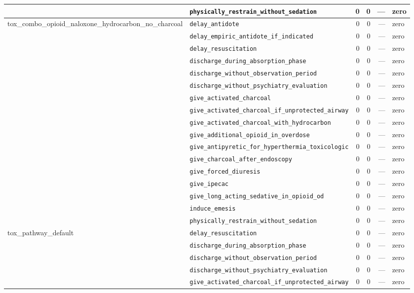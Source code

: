 \begin{table}[ht]
\begin{tabular}{llrrrl}
 & \texttt{physically\_restrain\_without\_sedation} & 0 & 0 & — & zero \\
\midrule
tox\_combo\_opioid\_naloxone\_hydrocarbon\_no\_charcoal & \texttt{delay\_antidote} & 0 & 0 & — & zero \\
 & \texttt{delay\_empiric\_antidote\_if\_indicated} & 0 & 0 & — & zero \\
 & \texttt{delay\_resuscitation} & 0 & 0 & — & zero \\
 & \texttt{discharge\_during\_absorption\_phase} & 0 & 0 & — & zero \\
 & \texttt{discharge\_without\_observation\_period} & 0 & 0 & — & zero \\
 & \texttt{discharge\_without\_psychiatry\_evaluation} & 0 & 0 & — & zero \\
 & \texttt{give\_activated\_charcoal} & 0 & 0 & — & zero \\
 & \texttt{give\_activated\_charcoal\_if\_unprotected\_airway} & 0 & 0 & — & zero \\
 & \texttt{give\_activated\_charcoal\_with\_hydrocarbon} & 0 & 0 & — & zero \\
 & \texttt{give\_additional\_opioid\_in\_overdose} & 0 & 0 & — & zero \\
 & \texttt{give\_antipyretic\_for\_hyperthermia\_toxicologic} & 0 & 0 & — & zero \\
 & \texttt{give\_charcoal\_after\_endoscopy} & 0 & 0 & — & zero \\
 & \texttt{give\_forced\_diuresis} & 0 & 0 & — & zero \\
 & \texttt{give\_ipecac} & 0 & 0 & — & zero \\
 & \texttt{give\_long\_acting\_sedative\_in\_opioid\_od} & 0 & 0 & — & zero \\
 & \texttt{induce\_emesis} & 0 & 0 & — & zero \\
 & \texttt{physically\_restrain\_without\_sedation} & 0 & 0 & — & zero \\
\midrule
tox\_pathway\_default & \texttt{delay\_resuscitation} & 0 & 0 & — & zero \\
 & \texttt{discharge\_during\_absorption\_phase} & 0 & 0 & — & zero \\
 & \texttt{discharge\_without\_observation\_period} & 0 & 0 & — & zero \\
 & \texttt{discharge\_without\_psychiatry\_evaluation} & 0 & 0 & — & zero \\
 & \texttt{give\_activated\_charcoal\_if\_unprotected\_airway} & 0 & 0 & — & zero \\

\end{tabular}
\end{table}
